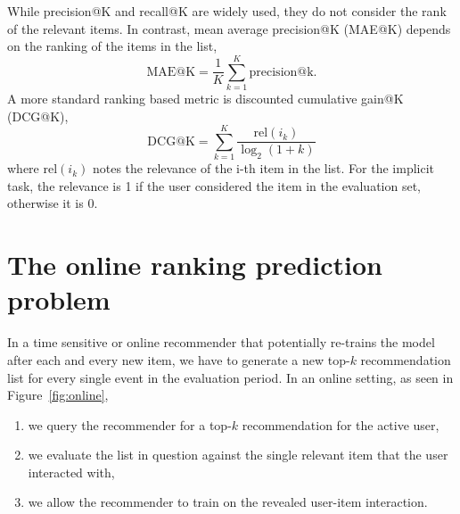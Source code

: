 \documentclass[10pt]{article}
\newenvironment{myenumerate}{\begin{enumerate} \setlength{\topsep}{0pt} \setlength{\itemsep}{0pt} \setlength{\parskip}{0pt} \setlength{\parsep}{0pt} }{  \end{enumerate} }
\begin{document}
While precision@K and recall@K are widely used, they do not consider the rank of the relevant items.
In contrast, mean average precision@K (MAE@K) depends on the ranking of the items in the list, 
\begin{equation}
	\text{MAE@K} = \frac{1}{K} \displaystyle\sum_{k=1}^K  \text{precision@k}.
\end{equation}
A more standard ranking based metric is discounted cumulative gain@K (DCG@K),
\begin{equation}
	\text{DCG@K} = \displaystyle\sum_{k=1}^K \frac{\text{rel}(i_k)}{\log_2(1 + k)}
	\label{eq:dcg}
\end{equation}
where $\text{rel}(i_k)$ notes the relevance of the i-th item in the list.
For the implicit task, the relevance is 1 if the user considered the item in the evaluation set, otherwise it is 0.

\section{The online ranking prediction problem}
\label{sec:ranking-prediction}

In a time sensitive or online recommender that potentially re-trains the model after each and every new item, we have to generate a new top-$k$ recommendation list for every single event in the evaluation period.
In an online setting, as seen in Figure~\ref{fig:online},
\begin{myenumerate}
\item we query the recommender for a top-$k$ recommendation for the active user,
\item we evaluate the list in question against the single relevant item that the user interacted with,
\item we allow the recommender to train on the revealed user-item interaction.
\end{myenumerate}
\end{document}
